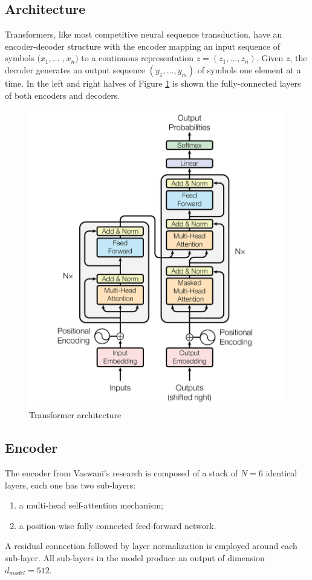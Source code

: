 \documentclass[\main/main.tex]{subfiles}
\begin{document}
\newpage
\subsection{Architecture}
Transformers, like most competitive neural sequence transduction, have an encoder-decoder structure with the encoder mapping an input sequence of symbols $(x_1, \dots$ $, x_n)$ to a continuous representation $z = (z_1, \dots, z_n)$. Given $z$, the decoder generates an output sequence $(y_1, \dots, y_m)$ of symbols one element at a time. In the left and right halves of Figure \ref{fig:transformer_architecture} is shown the fully-connected layers of both encoders and decoders.
\begin{figure}[H]
    \centering
    \includegraphics[scale=0.4]{images/transformer/transformer_model_architecture.png}
    \caption{Transformer architecture}
    \label{fig:transformer_architecture}
\end{figure}

\subsection{Encoder}
The encoder from Vaswani's research \cite{vaswani2017attention} is composed of a stack of $N=6$ identical layers, each one has two sub-layers:
\begin{enumerate}
    \item a multi-head self-attention mechanism;
    \item a position-wise fully connected feed-forward network.
\end{enumerate}
A residual connection followed by layer normalization is employed around each sub-layer. All sub-layers in the model produce an output of dimension $d_{model} = 512$.
\end{document}
